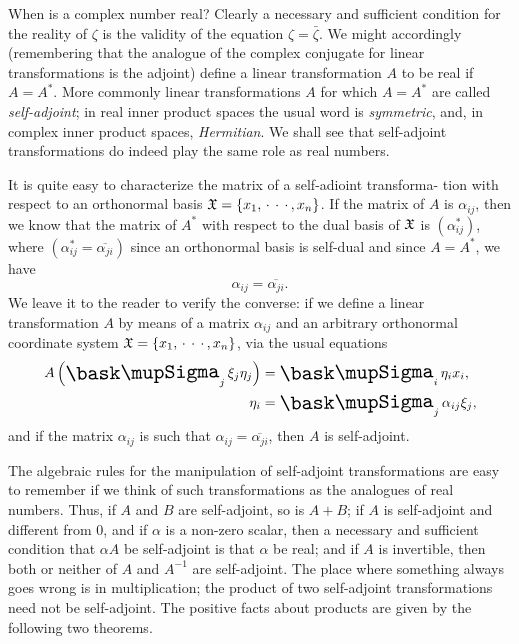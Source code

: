 When is a complex number real? Clearly a necessary and sufficient condition for
the reality of \(\zeta\) is the validity of the equation \(\zeta =
\bar{\zeta}\). We might accordingly (remembering that the analogue of the
complex conjugate for linear transformations is the adjoint) define a linear
transformation \(A\) to be real if \(A = A^*\). More commonly linear
transformations \(A\) for which \(A = A^*\) are called \emph{self-adjoint}; in
real inner product spaces the usual word is \emph{symmetric}, and, in complex
inner product spaces, \emph{Hermitian}. We shall see that self-adjoint
transformations do indeed play the same role as real numbers.

It is quite easy to characterize the matrix of a self-adioint transforma- tion
with respect to an orthonormal basis \(\frak{X} = \{x_1,
\, \cdot\, \cdot\, \cdot\,, x_n\}\). If the matrix of \(A\) is \(\alpha_{ij}\),
then we know that the matrix of \(A^*\) with respect to the dual basis of
\(\frak{X}\) is \((\alpha_{ij}^*)\), where \((\alpha_{ij}^* =
\overline{\alpha_{ji}})\) since an orthonormal basis is self-dual and since \(A
= A^*\), we have
\begin{equation*}
    \alpha_{ij} = \overline{\alpha_{ji}}.
\end{equation*}
We leave it to the reader to verify the converse: if we define a linear
transformation \(A\) by means of a matrix \(\alpha_{ij}\) and an arbitrary
orthonormal coordinate system \(\frak{X} = \{x_1, \, \cdot\, \cdot\, \cdot\,,
x_n\}\), via the usual equations
\begin{align*} 
    A\left(\sumx_j \xi_j \eta_j\right) &= \sumx_i \eta_i x_i, \\
    \eta_i &= \sumx_j \alpha_{ij} \xi_j,
\end{align*}
and if the matrix \(\alpha_{ij}\) is such that \(\alpha_{ij} = \overline{\alpha_{ji}}\), then \(A\) is self-adjoint.

The algebraic rules for the manipulation of self-adjoint transformations are
easy to remember if we think of such transformations as the analogues of real
numbers. Thus, if \(A\) and \(B\) are self-adjoint, so is \(A + B\); if \(A\) is
self-adjoint and different from \(0\), and if \(\alpha\) is a non-zero scalar,
then a necessary and sufficient condition that \(\alpha A\) be self-adjoint is
that \(\alpha\) be real; and if \(A\) is invertible, then both or neither of
\(A\) and \(A^{-1}\) are self-adjoint. The place where something always goes
wrong is in multiplication; the product of two self-adjoint transformations need
not be self-adjoint. The positive facts about products are given by the
following two theorems.


